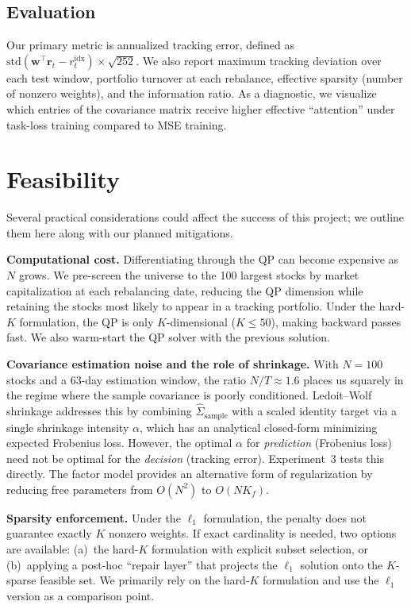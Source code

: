 \documentclass[11pt]{article}
\begin{document}
\subsection{Evaluation}

Our primary metric is annualized tracking error, defined as $\mathrm{std}(\mathbf{w}^\top \mathbf{r}_t - r_t^{\mathrm{idx}}) \times \sqrt{252}$. We also report maximum tracking deviation over each test window, portfolio turnover at each rebalance, effective sparsity (number of nonzero weights), and the information ratio. As a diagnostic, we visualize which entries of the covariance matrix receive higher effective ``attention'' under task-loss training compared to MSE training.

\section{Feasibility}

Several practical considerations could affect the success of this project; we outline them here along with our planned mitigations.

\textbf{Computational cost.}\; Differentiating through the QP can become expensive as $N$ grows. We pre-screen the universe to the 100 largest stocks by market capitalization at each rebalancing date, reducing the QP dimension while retaining the stocks most likely to appear in a tracking portfolio. Under the hard-$K$ formulation, the QP is only $K$-dimensional ($K \leq 50$), making backward passes fast. We also warm-start the QP solver with the previous solution.

\textbf{Covariance estimation noise and the role of shrinkage.}\; With $N=100$ stocks and a 63-day estimation window, the ratio $N/T \approx 1.6$ places us squarely in the regime where the sample covariance is poorly conditioned. Ledoit--Wolf shrinkage \citep{ledoit2004well} addresses this by combining $\hat{\Sigma}_{\mathrm{sample}}$ with a scaled identity target via a single shrinkage intensity $\alpha$, which has an analytical closed-form minimizing expected Frobenius loss. However, the optimal $\alpha$ for \emph{prediction} (Frobenius loss) need not be optimal for the \emph{decision} (tracking error). Experiment~3 tests this directly. The factor model provides an alternative form of regularization by reducing free parameters from $O(N^2)$ to $O(N K_f)$.

\textbf{Sparsity enforcement.}\; Under the $\ell_1$ formulation, the penalty does not guarantee exactly $K$ nonzero weights. If exact cardinality is needed, two options are available: (a)~the hard-$K$ formulation with explicit subset selection, or (b)~applying a post-hoc ``repair layer'' that projects the $\ell_1$ solution onto the $K$-sparse feasible set. We primarily rely on the hard-$K$ formulation and use the $\ell_1$ version as a comparison point.
\end{document}
